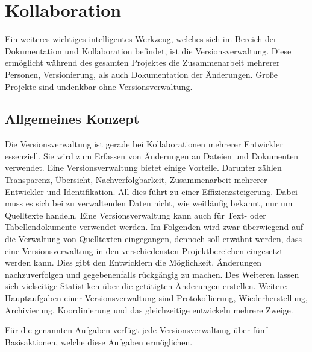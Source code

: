 \section{Kollaboration}
Ein weiteres wichtiges intelligentes Werkzeug, welches sich im Bereich der Dokumentation und Kollaboration befindet, ist die Versionsverwaltung. Diese ermöglicht während des gesamten Projektes die Zusammenarbeit mehrerer Personen, Versionierung, als auch Dokumentation der Änderungen. Große Projekte sind undenkbar ohne Versionsverwaltung.

\subsection{Allgemeines Konzept}
\label{subsubsec:vc}
Die Versionsverwaltung ist gerade bei Kollaborationen mehrerer Entwickler essenziell. Sie wird zum Erfassen von Änderungen an Dateien und Dokumenten verwendet. Eine Versionsverwaltung bietet einige Vorteile. Darunter zählen Transparenz, Übersicht, Nachverfolgbarkeit, Zusammenarbeit mehrerer Entwickler und Identifikation. All dies führt zu einer Effizienzsteigerung. Dabei muss es sich bei zu verwaltenden Daten nicht, wie weitläufig bekannt, nur um Quelltexte handeln. Eine Versionsverwaltung kann auch für Text- oder Tabellendokumente verwendet werden. Im Folgenden wird zwar überwiegend auf die Verwaltung von Quelltexten eingegangen, dennoch soll erwähnt werden, dass eine Versionsverwaltung in den verschiedensten Projektbereichen eingesetzt werden kann. Dies gibt den Entwicklern die Möglichkeit, Änderungen nachzuverfolgen und gegebenenfalls rückgängig zu machen. Des Weiteren lassen sich vielseitige Statistiken über die getätigten Änderungen erstellen. Weitere Hauptaufgaben einer Versionsverwaltung sind Protokollierung, Wiederherstellung, Archivierung, Koordinierung und das gleichzeitige entwickeln mehrere Zweige. 
\begin{comment}
	Ein Hautpelement einer Versionsverwaltung ist das Ermöglichen von continuous integration, continuous delivery (CI/CD). CI/CD ist eine Methode, welche die Automation von verschiedenen Stadien einer Anwendungsentwicklung ermöglicht. 
	
	Ein weitere Möglichkeit die das Werkzeug der Versionsverwaltung durch eine Zentrale Lagerung der Dateien ermöglicht, ist  continuous integration/continuous delivery (CI/CD). 	
\end{comment}
Für die genannten Aufgaben verfügt jede Versionsverwaltung über fünf Basisaktionen, welche diese Aufgaben ermöglichen. 
